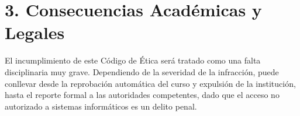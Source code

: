 \documentclass[12pt,a4paper]{article}
\begin{document}
\section*{3. Consecuencias Académicas y Legales}
El incumplimiento de este Código de Ética será tratado como una falta disciplinaria muy grave. Dependiendo de la severidad de la infracción, puede conllevar desde la reprobación automática del curso y expulsión de la institución, hasta el reporte formal a las autoridades competentes, dado que el acceso no autorizado a sistemas informáticos es un delito penal.

\vspace{1.5cm}

\begin{center}
\end{center}
\end{document}
